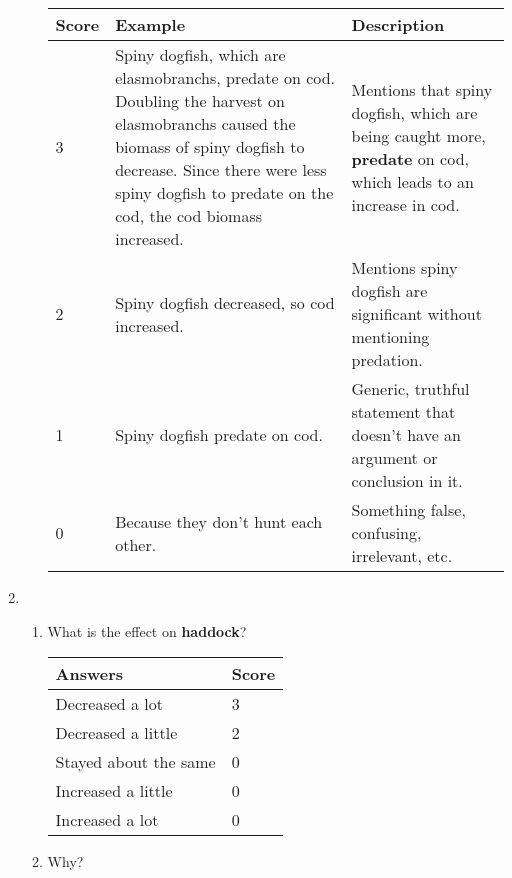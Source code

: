 \begin{enumerate}
\begin{enumerate}
\begin{tabular}{| l | p{5.25cm} | p{5.7cm} |} \hline
\rowcolor{violet!35} \textbf{Score} & \textbf{Example} & \textbf{Description} \\ \hline
3 & Spiny dogfish, which are elasmobranchs, predate on cod. Doubling the harvest on elasmobranchs caused the biomass of spiny dogfish to decrease. Since there were less spiny dogfish to predate on the cod, the cod biomass increased. & Mentions that spiny dogfish, which are being caught more, \textbf{predate} on cod, which leads to an increase in cod. \\ 
2 & Spiny dogfish decreased, so cod increased. & Mentions spiny dogfish are significant without mentioning predation. \\ 
1 & Spiny dogfish predate on cod. & Generic, truthful statement that doesn't have an argument or conclusion in it. \\ 
0 & Because they don't hunt each other. & Something false, confusing, irrelevant, etc. \\
\hline
\end{tabular}

\end{enumerate}

\item 
\begin{enumerate}
\item What is the effect on \textbf{haddock}?


\begin{tabular}{| l | l |} \hline
\rowcolor{violet!35} \textbf{Answers} & \textbf{Score} \\ \hline
Decreased a lot & 3 \\ 
Decreased a little & 2 \\ 
Stayed about the same & 0 \\ 
Increased a little & 0 \\
Increased a lot & 0 \\
\hline
\end{tabular}

\item Why?


\end{enumerate}
\end{enumerate}
